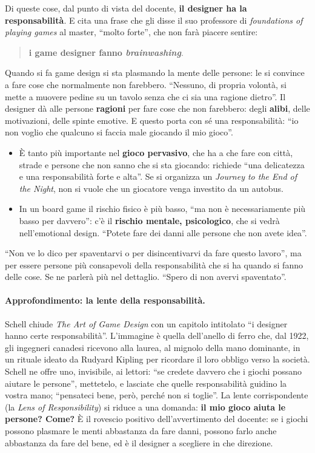 Di queste cose, dal punto di vista del docente, \textbf{il designer ha la
responsabilità}. E cita una frase che gli disse il suo professore di
\emph{foundations of playing games} al master, ``molto forte'', che non farà
piacere sentire:
\begin{quote}
\textbf{i game designer fanno \emph{brainwashing}}.
\end{quote}
Quando si fa game design si sta plasmando la mente delle persone: le si convince
a fare cose che normalmente non farebbero. ``Nessuno, di propria volontà, si mette
a muovere pedine su un tavolo senza che ci sia una ragione dietro''. Il designer
dà alle persone \textbf{ragioni} per fare cose che non farebbero: degli
\textbf{alibi}, delle motivazioni, delle spinte emotive. E questo porta con sé una
responsabilità: ``io non voglio che qualcuno si faccia male giocando il mio
gioco''.
\begin{itemize}
  \item È tanto più importante nel \textbf{gioco pervasivo}, che ha a che fare
        con città, strade e persone che non sanno che si sta giocando:
        richiede ``una delicatezza e una responsabilità forte e alta''. Se si
        organizza un \emph{Journey to the End of the Night}, non si vuole che un
        giocatore venga investito da un autobus.
  \item In un board game il rischio fisico è più basso, ``ma non è
        necessariamente più basso per davvero'': c'è il \textbf{rischio mentale,
        psicologico}, che si vedrà nell'emotional design. ``Potete fare dei danni
        alle persone che non avete idea''.
\end{itemize}
``Non ve lo dico per spaventarvi o per disincentivarvi da fare questo lavoro'',
ma per essere persone più consapevoli della responsabilità che si ha quando si
fanno delle cose. Se ne parlerà più nel dettaglio. ``Spero di non avervi
spaventato''.

\paragraph{Approfondimento: la lente della responsabilità.} Schell chiude
\emph{The Art of Game Design} con un capitolo intitolato ``i designer hanno certe
responsabilità''. L'immagine è quella dell'anello di ferro che, dal 1922, gli
ingegneri canadesi ricevono alla laurea, al mignolo della mano dominante, in un
rituale ideato da Rudyard Kipling per ricordare il loro obbligo verso la
società. Schell ne offre uno, invisibile, ai lettori: ``se credete davvero che i
giochi possano aiutare le persone'', mettetelo, e lasciate che quelle
responsabilità guidino la vostra mano; ``pensateci bene, però, perché non si
toglie''. La lente corrispondente (la \emph{Lens of Responsibility}) si riduce a
una domanda: \textbf{il mio gioco aiuta le persone? Come?} È il rovescio positivo
dell'avvertimento del docente: se i giochi possono plasmare le menti abbastanza da
fare danni, possono farlo anche abbastanza da fare del bene, ed è il designer a
scegliere in che direzione.

